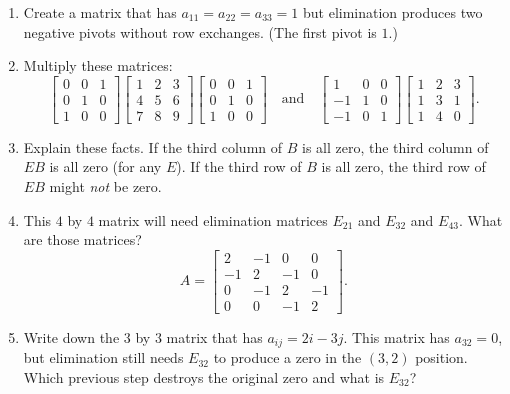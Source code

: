 \documentclass[14pt, a4paper]{article}
\begin{document}
\begin{enumerate}
    \item Create a matrix that has $a_{11} = a_{22} = a_{33} = 1$ but elimination produces two negative pivots without row exchanges. (The first pivot is $1$.)

    \item Multiply these matrices:
          \[
              \begin{bmatrix}
                  0 & 0 & 1 \\
                  0 & 1 & 0 \\
                  1 & 0 & 0
              \end{bmatrix}
              \begin{bmatrix}
                  1 & 2 & 3 \\
                  4 & 5 & 6 \\
                  7 & 8 & 9
              \end{bmatrix}
              \begin{bmatrix}
                  0 & 0 & 1 \\
                  0 & 1 & 0 \\
                  1 & 0 & 0
              \end{bmatrix}
              \quad\text{and}\quad
              \begin{bmatrix}
                  1  & 0 & 0 \\
                  -1 & 1 & 0 \\
                  -1 & 0 & 1
              \end{bmatrix}
              \begin{bmatrix}
                  1 & 2 & 3 \\
                  1 & 3 & 1 \\
                  1 & 4 & 0
              \end{bmatrix}.
          \]

    \item Explain these facts. If the third column of $B$ is all zero, the third column of $EB$ is all zero (for any $E$). If the third row of $B$ is all zero, the third row of $EB$ might \textit{not} be zero.

    \item This $4$ by $4$ matrix will need elimination matrices $E_{21}$ and $E_{32}$ and $E_{43}$. What are those matrices?
          \[
              A = \begin{bmatrix}
                  2  & -1 & 0  & 0  \\
                  -1 & 2  & -1 & 0  \\
                  0  & -1 & 2  & -1 \\
                  0  & 0  & -1 & 2
              \end{bmatrix}.
          \]

    \item Write down the $3$ by $3$ matrix that has $a_{ij} = 2i - 3j$. This matrix has $a_{32} = 0$, but elimination still needs $E_{32}$ to produce a zero in the $(3,2)$ position. Which previous step destroys the original zero and what is $E_{32}$?

\end{enumerate}
\end{document}
